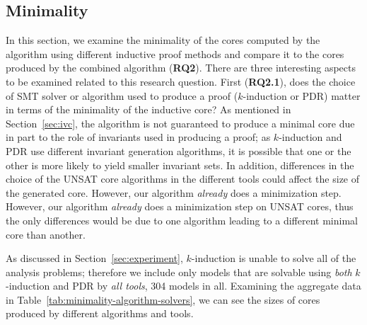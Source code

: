 \subsection{Minimality}
\label{sec:minimality}
In this section, we examine the minimality of the cores computed by the \ucalg algorithm using different inductive proof methods and compare it to the cores produced by the combined algorithm (\textbf{RQ2}).  There are three interesting aspects to be examined related to this research question.  First (\textbf{RQ2.1}), does the choice of SMT solver or algorithm used to produce a proof ($k$-induction or PDR) matter in terms of the minimality of the inductive core?   As mentioned in Section~\ref{sec:ivc}, the \ucalg algorithm is not guaranteed to produce a minimal core due in part to the role of invariants used in producing a proof; as $k$-induction and PDR use different invariant generation algorithms, it is possible that one or the other is more likely to yield smaller invariant sets.  In addition, differences in the choice of the UNSAT core algorithms in the different tools could affect the size of the generated core.  However, our algorithm {\em already} does a minimization step.  However,
our algorithm {\em already} does a minimization step on UNSAT cores,
thus the only differences would be due to one algorithm leading to a
different minimal core than another.

As discussed in Section~\ref{sec:experiment}, $k$-induction is unable to solve all of the analysis problems; therefore we include only models that are solvable using {\em both} $k$-induction and PDR by {\em all tools}, 304 models in all.  Examining the aggregate data in Table~\ref{tab:minimality-algorithm-solvers}, we can see the sizes of cores produced by different algorithms and tools.






